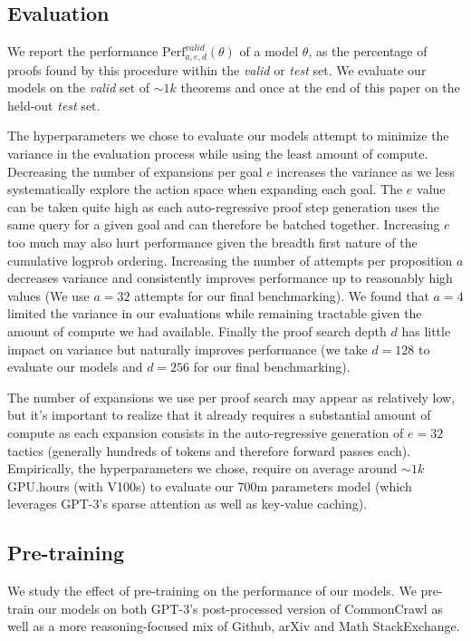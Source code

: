 \subsection{Evaluation}

We report the performance $\text{Perf}_{a,e,d}^{\mathit{valid}}(\theta)$ of a model $\theta$, as the percentage of proofs found by this procedure within the \textit{valid} or \textit{test} set. We evaluate our models on the \textit{valid} set of $\sim 1k$ theorems and once at the end of this paper on the held-out \textit{test} set.

The hyperparameters we chose to evaluate our models attempt to minimize the variance in the evaluation process while using the least amount of compute. Decreasing the number of expansions per goal $e$ increases the variance as we less systematically explore the action space when expanding each goal. The $e$ value can be taken quite high as each auto-regressive proof step generation uses the same query for a given goal and can therefore be batched together. Increasing $e$ too much may also hurt performance given the breadth first nature of the cumulative logprob ordering. Increasing the number of attempts per proposition $a$ decreases variance and consistently improves performance up to reasonably high values (We use $a=32$ attempts for our final benchmarking). We found that $a=4$ limited the variance in our evaluations while remaining tractable given the amount of compute we had available. Finally the proof search depth $d$ has little impact on variance but naturally improves performance (we take $d=128$ to evaluate our models and $d=256$ for our final benchmarking).

The number of expansions we use per proof search may appear as relatively low, but it's important to realize that it already requires a substantial amount of compute as each expansion consists in the auto-regressive generation of $e=32$ tactics (generally hundreds of tokens and therefore forward passes each). Empirically, the hyperparameters we chose, require on average around $\sim 1k$ GPU.hours (with V100s) to evaluate our 700m parameters model (which leverages GPT-3's sparse attention as well as key-value caching).

\subsection{Pre-training}

We study the effect of pre-training on the performance of our models. We pre-train our models on both GPT-3's post-processed version of CommonCrawl as well as a more reasoning-focused mix of Github, arXiv and Math StackExchange.

